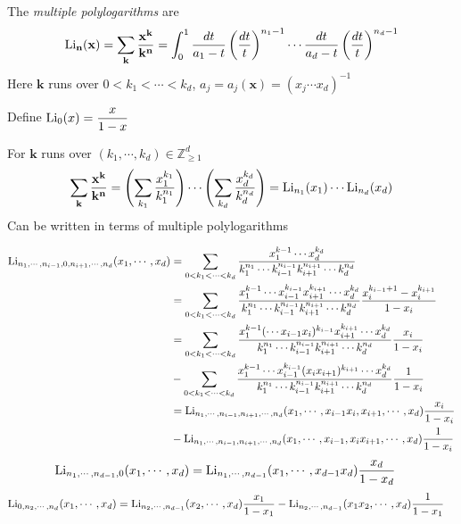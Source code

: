 \documentclass[main]{subfiles}
\begin{document}
\begin{definition}
The \textit{multiple polylogarithms} are
\[\operatorname{Li}_{\mathbf n}(\mathbf x)=\sum_{\mathbf k}\frac{\mathbf x^{\mathbf k}}{\mathbf k^{\mathbf n}}=\int_0^1\frac{dt}{a_1-t}\left(\frac{dt}{t}\right)^{n_1-1}\cdots\frac{dt}{a_d-t}\left(\frac{dt}{t}\right)^{n_d-1}\]
Here $\mathbf k$ runs over $0<k_1<\cdots<k_d$, $a_j=a_j(\mathbf x)=(x_j\cdots x_d)^{-1}$
\end{definition}

Define $\operatorname{Li}_0(x)=\dfrac{x}{1-x}$

\begin{note}
For $\mathbf k$ runs over $(k_1,\cdots,k_d)\in\mathbb Z_{\geq1}^d$
\[\sum_{\mathbf k}\frac{\mathbf x^{\mathbf k}}{\mathbf k^{\mathbf n}}=\left(\sum_{k_1}\frac{x_1^{k_1}}{k_1^{n_1}}\right)\cdots\left(\sum_{k_d}\frac{x_d^{k_d}}{k_d^{n_d}}\right)=\operatorname{Li}_{n_1}(x_1)\cdots\operatorname{Li}_{n_d}(x_d)\]
Can be written in terms of multiple polylogarithms
\end{note}

\begin{note}
\begin{align*}
\operatorname{Li}_{n_1,\cdots,n_{i-1},0,n_{i+1},\cdots,n_{d}}(x_1,\cdots,x_d)&=\sum_{0<k_1<\cdots<k_d}\frac{x_1^{k-1}\cdots x_d^{k_d}}{k_1^{n_1}\cdots k_{i-1}^{n_{i-1}}k_{i+1}^{n_{i+1}}\cdots k_d^{n_d}} \\
&=\sum_{0<k_1<\cdots<k_d}\frac{x_1^{k-1}\cdots x_{i-1}^{k_{i-1}}x_{i+1}^{k_{i+1}}\cdots x_d^{k_d}}{k_1^{n_1}\cdots k_{i-1}^{n_{i-1}}k_{i+1}^{n_{i+1}}\cdots k_d^{n_d}}\frac{x_i^{k_{i-1}+1}-x_i^{k_{i+1}}}{1-x_i} \\
&=\sum_{0<k_1<\cdots<k_d}\frac{x_1^{k-1}(\cdots x_{i-1}x_i)^{k_{i-1}}x_{i+1}^{k_{i+1}}\cdots x_d^{k_d}}{k_1^{n_1}\cdots k_{i-1}^{n_{i-1}}k_{i+1}^{n_{i+1}}\cdots k_d^{n_d}}\frac{x_i}{1-x_i} \\
&-\sum_{0<k_1<\cdots<k_d}\frac{x_1^{k-1}\cdots x_{i-1}^{k_{i-1}}(x_ix_{i+1})^{k_{i+1}}\cdots x_d^{k_d}}{k_1^{n_1}\cdots k_{i-1}^{n_{i-1}}k_{i+1}^{n_{i+1}}\cdots k_d^{n_d}}\frac{1}{1-x_i} \\
&=\operatorname{Li}_{n_1,\cdots,n_{i-1},n_{i+1},\cdots,n_{d}}(x_1,\cdots,x_{i-1}x_i,x_{i+1},\cdots,x_d)\frac{x_i}{1-x_i} \\
&-\operatorname{Li}_{n_1,\cdots,n_{i-1},n_{i+1},\cdots,n_{d}}(x_1,\cdots,x_{i-1},x_ix_{i+1},\cdots,x_d)\frac{1}{1-x_i}
\end{align*}
\begin{align*}
\operatorname{Li}_{n_1,\cdots,n_{d-1},0}(x_1,\cdots,x_d)&=\operatorname{Li}_{n_1,\cdots,n_{d-1}}(x_1,\cdots,x_{d-1}x_d)\frac{x_d}{1-x_d}
\end{align*}
\begin{align*}
\operatorname{Li}_{0,n_2,\cdots,n_{d}}(x_1,\cdots,x_d)&=\operatorname{Li}_{n_2,\cdots,n_{d-1}}(x_2,\cdots,x_d)\frac{x_1}{1-x_1} - \operatorname{Li}_{n_2,\cdots,n_{d-1}}(x_1x_2,\cdots,x_d)\frac{1}{1-x_1}
\end{align*}
\end{note}
\end{document}
